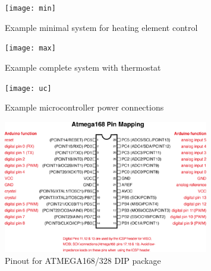 \documentclass[dvips,12pt]{article}
\begin{document}
\begin{figure}[h]
    \begin{centering}
    \texttt{[image: min]}
    \caption{Example minimal system for heating element control}
    \label{fig:min}
    \end{centering}
\end{figure}


\begin{figure}[h]
    \begin{centering}
    \texttt{[image: max]}
    \caption{Example complete system with thermostat} 
    \label{fig:max}
    \end{centering}
\end{figure}

\begin{figure}[h]
    \begin{centering}
    \texttt{[image: uc]}
    \caption{Example microcontroller power connections} 
    \label{fig:uc}
    \end{centering}
\end{figure}
\begin{figure}[h]
    \begin{centering}
    \includegraphics[width=0.8\textwidth]{pins}
    \caption{Pinout for ATMEGA168/328 DIP package} 
    \label{fig:pins}
    \end{centering}
\end{figure}




\centering
\vspace{2cm}
\appendix
\end{document}
